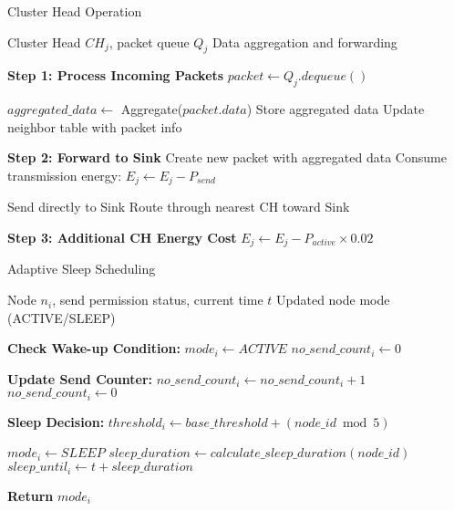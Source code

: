 \documentclass{article}
\begin{document}
\begin{algorithm}[H]
\caption{Cluster Head Operation}
\label{alg:cluster_head}
\begin{algorithmic}[1]

\REQUIRE Cluster Head $CH_j$, packet queue $Q_j$
\ENSURE Data aggregation and forwarding

\STATE \textbf{Step 1: Process Incoming Packets}
    \STATE $packet \leftarrow Q_j.dequeue()$
    
        \STATE $aggregated\_data \leftarrow$ Aggregate($packet.data$)
        \STATE Store aggregated data
        \STATE Update neighbor table with packet info
    \ENDIF
    
    \STATE \textbf{Step 2: Forward to Sink}
    \STATE Create new packet with aggregated data
    \STATE Consume transmission energy: $E_j \leftarrow E_j - P_{send}$
    
        \STATE Send directly to Sink
    \ELSE
        \STATE Route through nearest CH toward Sink
    \ENDIF
\ENDWHILE

\STATE \textbf{Step 3: Additional CH Energy Cost}
\STATE $E_j \leftarrow E_j - P_{active} \times 0.02$ 

\end{algorithmic}
\end{algorithm}

\begin{algorithm}[H]
\caption{Adaptive Sleep Scheduling}
\label{alg:sleep_scheduling}
\begin{algorithmic}[1]

\REQUIRE Node $n_i$, send permission status, current time $t$
\ENSURE Updated node mode (ACTIVE/SLEEP)

\STATE \textbf{Check Wake-up Condition:}
    \STATE $mode_i \leftarrow ACTIVE$
    \STATE $no\_send\_count_i \leftarrow 0$
\ENDIF

\STATE \textbf{Update Send Counter:}
    \STATE $no\_send\_count_i \leftarrow no\_send\_count_i + 1$
\ELSE
    \STATE $no\_send\_count_i \leftarrow 0$
\ENDIF

\STATE \textbf{Sleep Decision:}
\STATE $threshold_i \leftarrow base\_threshold + (node\_id \bmod 5)$

    \STATE $mode_i \leftarrow SLEEP$
    \STATE $sleep\_duration \leftarrow calculate\_sleep\_duration(node\_id)$
    \STATE $sleep\_until_i \leftarrow t + sleep\_duration$
\ENDIF

\STATE \textbf{Return} $mode_i$

\end{algorithmic}
\end{algorithm}
\end{document}
